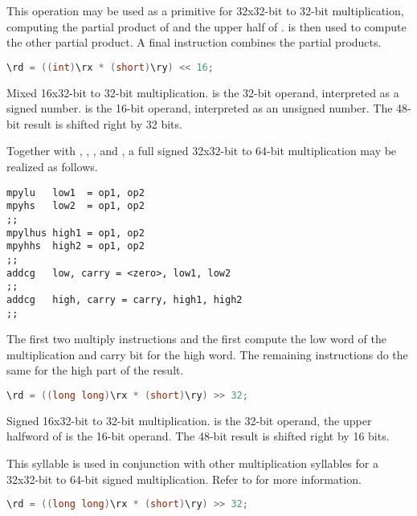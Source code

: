 This operation may be used as a primitive for 32x32-bit to 32-bit
multiplication, computing the partial product of \code{\rx} and the upper half
of \code{\ry}.  is then used to compute the other partial product. A
final  instruction combines the partial products.

\begin{lstlisting}[numbers=none, basicstyle=\ttfamily\footnotesize, language=C++]
\rd = ((int)\rx * (short)\ry) << 16;
\end{lstlisting}

Mixed 16x32-bit to 32-bit multiplication. \code{\rx} is the 32-bit operand,
interpreted as a signed number. \code{\ry} is the 16-bit operand, interpreted as
an unsigned number. The 48-bit result is shifted right by 32 bits.

Together with , , ,  and
, a full signed 32x32-bit to 64-bit multiplication may be realized
as follows.

\begin{lstlisting}[numbers=none, basicstyle=\ttfamily\footnotesize, language=vexasm]
mpylu   low1  = op1, op2
mpyhs   low2  = op1, op2
;;
mpylhus high1 = op1, op2
mpyhhs  high2 = op1, op2
;;
addcg   low, carry = <zero>, low1, low2
;;
addcg   high, carry = carry, high1, high2
;;
\end{lstlisting}

\noindent The first two multiply instructions and the first  compute
the low word of the multiplication and carry bit for the high word. The
remaining instructions do the same for the high part of the result.

\begin{lstlisting}[numbers=none, basicstyle=\ttfamily\footnotesize, language=C++]
\rd = ((long long)\rx * (short)\ry) >> 32;
\end{lstlisting}

Signed 16x32-bit to 32-bit multiplication. \code{\rx} is the 32-bit operand,
the upper halfword of \code{\ry} is the 16-bit operand. The 48-bit result is
shifted right by 16 bits.

This syllable is used in conjunction with other multiplication syllables for a
32x32-bit to 64-bit signed multiplication. Refer to  for more
information.

\begin{lstlisting}[numbers=none, basicstyle=\ttfamily\footnotesize, language=C++]
\rd = ((long long)\rx * (short)\ry) >> 32;
\end{lstlisting}
